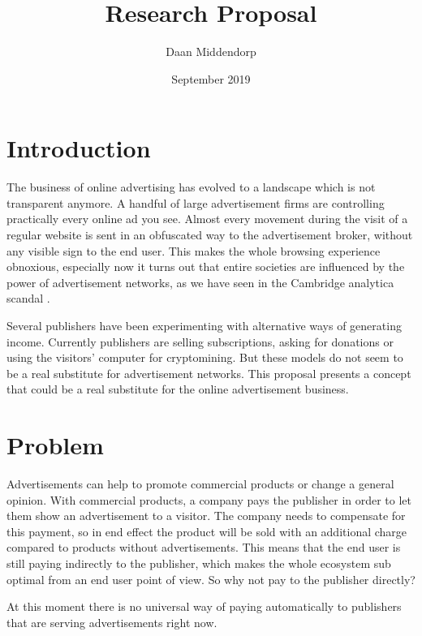 \documentclass[a4paper]{article}
\title{Research Proposal}
\author{Daan Middendorp}
\date{September 2019}
\begin{document}
\maketitle

\section{Introduction}
The business of online advertising has evolved to a landscape which is not transparent anymore. A handful of large advertisement firms are controlling practically every online ad you see. Almost every movement during the visit of a regular website is sent in an obfuscated way to the advertisement broker, without any visible sign to the end user. This makes the whole browsing experience obnoxious, especially now it turns out that entire societies are influenced by the power of advertisement networks, as we have seen in the Cambridge analytica scandal .

Several publishers have been experimenting with alternative ways of generating income. Currently publishers are selling subscriptions, asking for donations or using the visitors' computer for cryptomining. But these models do not seem to be a real substitute for advertisement networks. This proposal presents a concept that could be a real substitute for the online advertisement business.

\section{Problem}
Advertisements can help to promote commercial products or change a general opinion. With commercial products, a company pays the publisher in order to let them show an advertisement to a visitor. The company needs to compensate for this payment, so in end effect the product will be sold with an additional charge compared to products without advertisements. This means that the end user is still paying indirectly to the publisher, which makes the whole ecosystem sub optimal from an end user point of view. So why not pay to the publisher directly?

At this moment there is no universal way of paying automatically to publishers that are serving advertisements right now.
\end{document}
